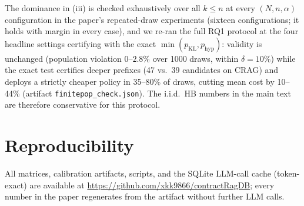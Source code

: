 \documentclass[sigconf,nonacm]{acmart}
\begin{document}
The dominance in (iii) is checked exhaustively over all $k \le n$ at
every $(N, n, \alpha)$ configuration in the paper's repeated-draw
experiments (sixteen configurations; it holds with margin in every
case), and we re-ran the full RQ1 protocol at the four headline
settings certifying with the exact
$\min(p_{\mathrm{KL}}, p_{\mathrm{hyp}})$: validity is unchanged
(population violation $0$--$2.8\%$ over 1000 draws, within
$\delta = 10\%$) while the exact test certifies deeper prefixes (47
vs.\ 39 candidates on CRAG) and deploys a strictly cheaper policy in
35--80\% of draws, cutting mean cost by 10--44\% (artifact
\texttt{finitepop\_check.json}). The i.i.d.\ HB numbers in the main
text are therefore conservative for this protocol.

\section{Reproducibility}
All matrices, calibration artifacts, scripts, and the SQLite LLM-call
cache (token-exact) are available at
\url{https://github.com/xkk9866/contractRagDB}; every number in
the paper regenerates
from the artifact without further LLM calls.
\end{document}
